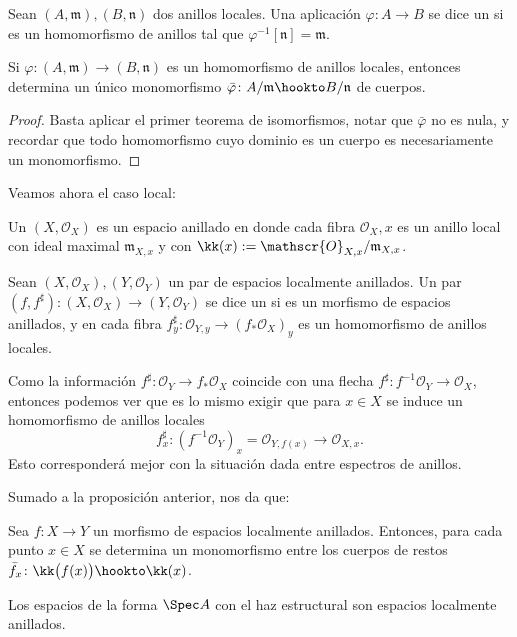 \begin{mydef}
	Sean $(A, \mathfrak{m}), (B, \mathfrak{n})$ dos anillos locales.
	Una aplicación $\varphi \colon A \to B$ se dice un 
	si es un homomorfismo de anillos tal que $\varphi^{-1}[\mathfrak{n}] = \mathfrak{m}$.
\end{mydef}
\begin{prop}
	Si $\varphi \colon (A, \mathfrak{m}) \to (B, \mathfrak{n})$ es un homomorfismo de anillos locales,
	entonces determina un único monomorfismo $\bar\varphi\colon A/\mathfrak{m} \hookto B/\mathfrak{n}$ de cuerpos.
\end{prop}
\begin{proof}
	Basta aplicar el primer teorema de isomorfismos, notar que $\bar \varphi$ no es nula, y recordar que todo homomorfismo cuyo dominio es un
	cuerpo es necesariamente un monomorfismo.
\end{proof}
Veamos ahora el caso local:
\begin{mydef}
	Un  $(X, \mathscr{O}_X )$ es un espacio anillado en donde
	cada fibra $\mathscr{O}_X,x$ es un anillo local con ideal maximal $\mathfrak{m}_{X,x}$ y con 
	$\kk(x) := \mathscr{O}_{X, x} / \mathfrak{m}_{X, x}$.

	Sean $(X, \mathscr{O}_X ), (Y, \mathscr{O}_Y )$ un par de espacios localmente anillados.
	Un par $(f, f^\sharp ) \colon (X, \mathscr{O}_X ) \to (Y, \mathscr{O}_Y )$ se dice un %
	 si es un morfismo de espacios anillados, y en cada fibra $f_y^\sharp \colon \mathscr{O}_{Y,y} \to 
	(f_*\mathscr{O}_X)_y$ es un homomorfismo de anillos locales.
\end{mydef}
Como la información $f^\sharp \colon \mathscr{O}_Y \to f_* \mathscr{O}_X$ coincide con una flecha $f^\sharp \colon f^{-1} \mathscr{O}_Y \to \mathscr{O}_X$,
entonces podemos ver que es lo mismo exigir que para $x \in X$ se induce un homomorfismo de anillos locales
$$ f_x^\sharp \colon (f^{-1} \mathscr{O}_Y )_x = \mathscr{O}_{Y,f (x)} \longrightarrow \mathscr{O}_{X,x}. $$
Esto corresponderá mejor con la situación dada entre espectros de anillos.

Sumado a la proposición anterior, nos da que:
\begin{prop}\label{thm:mono_fibers}
	Sea $f \colon X \to Y$ un morfismo de espacios localmente anillados.
	Entonces, para cada punto $x \in X$ se determina un monomorfismo entre los cuerpos de restos $\bar f_x \colon \kk\big( f(x) \big) \hookto \kk(x)$.
\end{prop}
\begin{cor}
	Los espacios de la forma $\Spec A$ con el haz estructural son espacios localmente anillados.
\end{cor}

